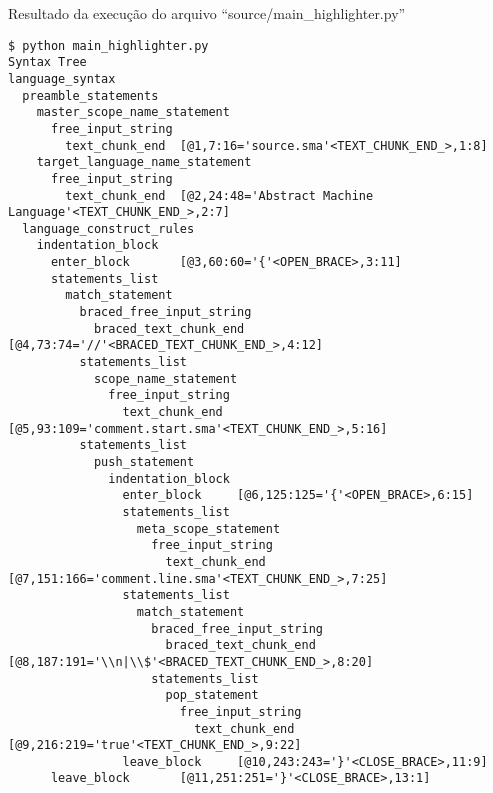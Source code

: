 \begin{code}
\caption{Resultado da execução do arquivo ``source/main\_highlighter.py''}
\label{MainHighlighterPyResult}
\begin{verbatim}
$ python main_highlighter.py
Syntax Tree
language_syntax
  preamble_statements
    master_scope_name_statement
      free_input_string
        text_chunk_end  [@1,7:16='source.sma'<TEXT_CHUNK_END_>,1:8]
    target_language_name_statement
      free_input_string
        text_chunk_end  [@2,24:48='Abstract Machine Language'<TEXT_CHUNK_END_>,2:7]
  language_construct_rules
    indentation_block
      enter_block       [@3,60:60='{'<OPEN_BRACE>,3:11]
      statements_list
        match_statement
          braced_free_input_string
            braced_text_chunk_end       [@4,73:74='//'<BRACED_TEXT_CHUNK_END_>,4:12]
          statements_list
            scope_name_statement
              free_input_string
                text_chunk_end  [@5,93:109='comment.start.sma'<TEXT_CHUNK_END_>,5:16]
          statements_list
            push_statement
              indentation_block
                enter_block     [@6,125:125='{'<OPEN_BRACE>,6:15]
                statements_list
                  meta_scope_statement
                    free_input_string
                      text_chunk_end    [@7,151:166='comment.line.sma'<TEXT_CHUNK_END_>,7:25]
                statements_list
                  match_statement
                    braced_free_input_string
                      braced_text_chunk_end     [@8,187:191='\\n|\\$'<BRACED_TEXT_CHUNK_END_>,8:20]
                    statements_list
                      pop_statement
                        free_input_string
                          text_chunk_end        [@9,216:219='true'<TEXT_CHUNK_END_>,9:22]
                leave_block     [@10,243:243='}'<CLOSE_BRACE>,11:9]
      leave_block       [@11,251:251='}'<CLOSE_BRACE>,13:1]


\end{verbatim}
\end{code}
